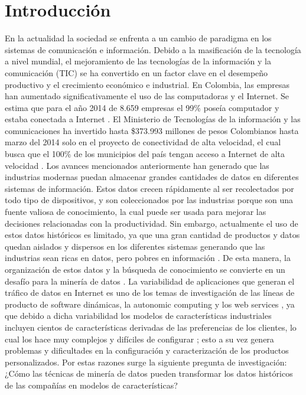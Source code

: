 \chapter{Introducción}

En la actualidad la sociedad se enfrenta a un cambio de paradigma en los sistemas de comunicación e información. Debido a la masificación de la tecnología a nivel mundial, el mejoramiento de las tecnologías de la información y la comunicación (TIC) se ha convertido en un factor clave en el desempeño productivo y el crecimiento económico e industrial. En Colombia, las empresas han aumentado significativamente el uso de las computadoras y el Internet. Se estima que para el año 2014 de 8.659 empresas el 99\% poseía computador y estaba conectada a Internet \cite{Comunicaciones2014}. El Ministerio de Tecnologías de la información y las comunicaciones ha invertido hasta \$373.993 millones de pesos Colombianos hasta marzo del 2014 solo en el proyecto de conectividad de alta velocidad, el cual busca que el 100\% de los municipios del país tengan acceso a Internet de alta velocidad \cite{Ardila2015}.
Los avances mencionados anteriormente han generado que las industrias modernas puedan almacenar grandes cantidades de datos en diferentes sistemas de información. Estos datos crecen rápidamente al ser recolectados por todo tipo de dispositivos, y son coleccionados por las industrias porque son una fuente valiosa de conocimiento, la cual puede ser usada para mejorar las decisiones relacionadas con la productividad. Sin embargo, actualmente el uso de estos datos históricos es limitado, ya que una gran cantidad de productos y datos quedan aislados y dispersos en los diferentes sistemas generando que las industrias sean ricas en datos, pero pobres en información \cite{Elovici2003}. De esta manera, la organización de estos datos y la búsqueda de conocimiento se convierte en un desafío para la minería de datos \cite{Hastie2009}.
La variabilidad de aplicaciones que generan el tráfico de datos en Internet es uno de los temas de investigación de las líneas de producto de software dinámicas, la autonomic computing y los web services \cite{Capilla2013}, ya que debido a dicha variabilidad los modelos de características industriales incluyen cientos de características derivadas de las preferencias de los clientes, lo cual los hace muy complejos y difíciles de configurar \cite{Asadi2014}; esto a su vez genera problemas y dificultades en la configuración y caracterización de los productos personalizados. Por estas razones surge la siguiente pregunta de investigación: ¿Cómo las técnicas de minería de datos pueden transformar los datos históricos de las compañías en modelos de características?
